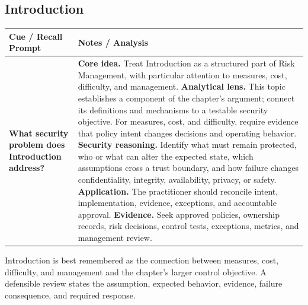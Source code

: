 \documentclass[11pt]{article}
\newcommand{\CornellHeader}{%
\rowcolor{Navy}\color{white}\bfseries Cue / Recall Prompt & \color{white}\bfseries Notes / Analysis\\\hline}
\newcommand{\CornellRow}[2]{%
\cellcolor{CueGray}\RaggedRight\textbf{#1} & \RaggedRight #2\\\hline}
\begin{document}
\subsection*{Introduction}
\begin{longtable}{>{\RaggedRight\arraybackslash}p{}|>{\RaggedRight\arraybackslash}p{}}
\CornellHeader
\CornellRow{What security problem does Introduction address?}{\textbf{Core idea.} Treat Introduction as a structured part of Risk Management, with particular attention to measures, cost, difficulty, and management. \textbf{Analytical lens.} This topic establishes a component of the chapter's argument; connect its definitions and mechanisms to a testable security objective. For measures, cost, and difficulty, require evidence that policy intent changes decisions and operating behavior. \textbf{Security reasoning.} Identify what must remain protected, who or what can alter the expected state, which assumptions cross a trust boundary, and how failure changes confidentiality, integrity, availability, privacy, or safety. \textbf{Application.} The practitioner should reconcile intent, implementation, evidence, exceptions, and accountable approval. \textbf{Evidence.} Seek approved policies, ownership records, risk decisions, control tests, exceptions, metrics, and management review.}
\end{longtable}
\begin{topicsummary}
Introduction is best remembered as the connection between measures, cost, difficulty, and management and the chapter's larger control objective. A defensible review states the assumption, expected behavior, evidence, failure consequence, and required response.
\end{topicsummary}
\end{document}
